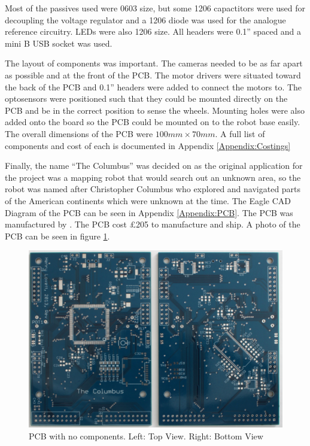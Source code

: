 Most of the passives used were 0603 size, but some 1206 capactitors were used for decoupling the voltage regulator and a 1206 diode was used for the analogue reference circuitry. LEDs were also 1206 size. All headers were 0.1'' spaced and a mini B USB socket was used. 

The layout of components was important. The cameras needed to be as far apart as possible and at the front of the PCB. The motor drivers were situated toward the back of the PCB and 0.1'' headers were added to connect the motors to. The optosensors were positioned such that they could be mounted directly on the PCB and be in the correct position to sense the wheels. Mounting holes were also added onto the board so the PCB could be mounted on to the robot base easily. The overall dimensions of the PCB were $100mm \times 70mm$. A full list of components and cost of each is documented in Appendix \ref{Appendix:Costings}


Finally, the name ``The Columbus'' was decided on as the original application for the project was a mapping robot that would search out an unknown area, so the robot was named after Christopher Columbus who explored and navigated parts of the American continents which were unknown at the time. The Eagle CAD Diagram of the PCB can be seen in Appendix \ref{Appendix:PCB}. The PCB was manufactured by \cite{PCBCart}. The PCB cost \pounds 205 to manufacture and ship. A photo of the PCB can be seen in figure \ref{fig:PCB:Bare}. 

\begin{figure}
\includegraphics[width=\textwidth]{./Figures/PCB_Bare.jpg}
\caption{PCB with no components. Left: Top View. Right: Bottom View}
\label{fig:PCB:Bare}
\end{figure}

